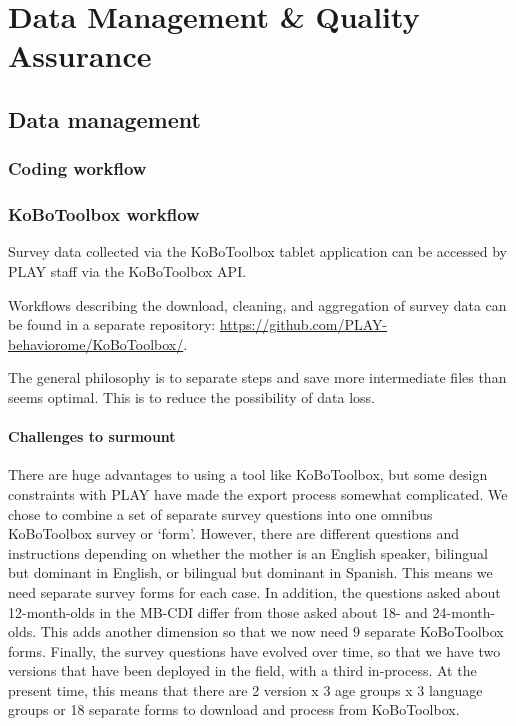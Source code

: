 \documentclass[
  12pt,
]{book}
\begin{document}
\hypertarget{part-data-management-quality-assurance}{%
\part*{Data Management \& Quality Assurance}\label{part-data-management-quality-assurance}}

\hypertarget{data-management}{%
\chapter{Data management}\label{data-management}}

\hypertarget{coding-workflow}{%
\section{Coding workflow}\label{coding-workflow}}

\hypertarget{kobotoolbox-workflow}{%
\section{KoBoToolbox workflow}\label{kobotoolbox-workflow}}

Survey data collected via the KoBoToolbox tablet application can be accessed by PLAY staff via the KoBoToolbox API.

Workflows describing the download, cleaning, and aggregation of survey data can be found in a separate repository: \url{https://github.com/PLAY-behaviorome/KoBoToolbox/}.

The general philosophy is to separate steps and save more intermediate files than seems optimal. This is to reduce the possibility of data loss.

\hypertarget{challenges-to-surmount}{%
\subsection{Challenges to surmount}\label{challenges-to-surmount}}

There are huge advantages to using a tool like KoBoToolbox, but some design constraints with PLAY have made the export process somewhat complicated. We chose to combine a set of separate survey questions into one omnibus KoBoToolbox survey or `form'. However, there are different questions and instructions depending on whether the mother is an English speaker, bilingual but dominant in English, or bilingual but dominant in Spanish. This means we need separate survey forms for each case. In addition, the questions asked about 12-month-olds in the MB-CDI differ from those asked about 18- and 24-month-olds. This adds another dimension so that we now need 9 separate KoBoToolbox forms. Finally, the survey questions have evolved over time, so that we have two versions that have been deployed in the field, with a third in-process. At the present time, this means that there are 2 version x 3 age groups x 3 language groups or 18 separate forms to download and process from KoBoToolbox.
\end{document}
